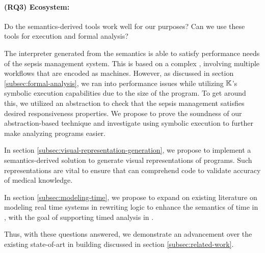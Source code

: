 \paragraph{(RQ3) Ecosystem:} Do the semantics-derived tools work well for
our purposes? Can we use these tools for execution and formal analysis?

The interpreter generated from the semantics is able to satisfy performance
needs of the sepsis management system. This \CDSS{} is based on a complex
\BPG{}, involving multiple workflows that are encoded as \MediK{} machines.
However, as discussed in section \ref{subsec:formal-analysis},
we ran into performance issues while utilizing $\mathbb{K}$'s symbolic
execution capabilities due to the size of the program. To get around this,
we utilized an abstraction to check that the sepsis management \CDSS{} satisfies
desired responsiveness properties. We propose to prove the soundness
of our abstraction-based technique and investigate using symbolic execution
to further make analyzing programs easier.

In section \ref{subsec:visual-representation-generation}, we propose to
implement a semantics-derived solution to generate visual representations
of \MediK{} programs. Such representations are vital to ensure that
\HCPs{} can comprehend \MediK{} code to validate accuracy of medical knowledge.

In section \ref{subsec:modeling-time}, we propose to expand on existing
literature on modeling real time systems in rewriting logic to enhance
the semantics of time in \MediK{}, with the goal of supporting timed
analysis in \MediK{}.

Thus, with these questions answered, we demonstrate an advancement over
the existing state-of-art in building \CDSSs{} discussed in section \ref{subsec:related-work}.

